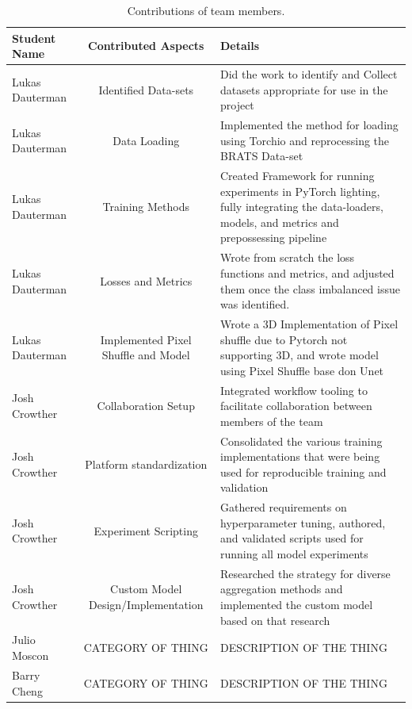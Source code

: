 \documentclass[10pt,twocolumn,letterpaper]{article}
\begin{document}
\begin{table}
\begin{center}
\begin{tabular}{|l|c|p{8cm}|}
\hline
\centering \textbf{Student Name} & \textbf{Contributed Aspects} & \textbf{Details} \\\hline

Lukas Dauterman & Identified Data-sets & Did the work to identify and Collect datasets appropriate for use in the project \\\hline
Lukas Dauterman & Data Loading & Implemented the method for loading using Torchio and reprocessing the BRATS Data-set \\\hline
Lukas Dauterman & Training Methods & Created Framework for running experiments in  PyTorch lighting, fully integrating the data-loaders, models, and metrics and prepossessing pipeline \\\hline
Lukas Dauterman & Losses and Metrics & Wrote from scratch the loss functions and metrics, and adjusted them once the class imbalanced issue was identified. \\\hline
Lukas Dauterman & Implemented Pixel Shuffle and Model & Wrote a 3D Implementation of Pixel shuffle due to Pytorch not supporting 3D, and wrote model using Pixel Shuffle base don Unet \\\hline

Josh Crowther & Collaboration Setup & Integrated workflow tooling to facilitate collaboration between members of the team \\\hline
Josh Crowther & Platform standardization & Consolidated the various training implementations that were being used for reproducible training and validation \\\hline
Josh Crowther & Experiment Scripting & Gathered requirements on hyperparameter tuning, authored, and validated scripts used for running all model experiments \\\hline
Josh Crowther & Custom Model Design/Implementation & Researched the strategy for diverse aggregation methods and implemented the custom model based on that research \\\hline

Julio Moscon & CATEGORY OF THING & DESCRIPTION OF THE THING \\\hline

Barry Cheng & CATEGORY OF THING & DESCRIPTION OF THE THING \\\hline

\end{tabular}
\end{center}
\caption{Contributions of team members.}
\label{tab:contributions}
\end{table}
\end{document}
